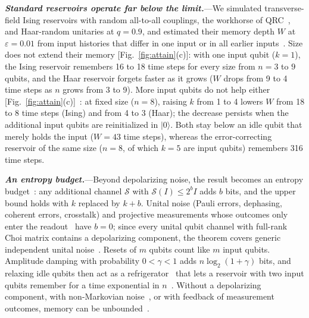 \documentclass[aps,prl,twocolumn,superscriptaddress,floatfix]{revtex4-2}
\theoremstyle{plain}
\newcommand{\ket}[1]{|#1\rangle}
\newcommand{\runin}[1]{\textit{\textbf{#1}}---}
\begin{document}
\runin{Standard reservoirs operate far below the limit.}We simulated transverse-field Ising reservoirs with random all-to-all couplings, the workhorse of QRC~\cite{Fujii2017,Nakajima2019,MartinezPena2021}, and Haar-random unitaries at $q=0.9$, and estimated their memory depth $W$ at $\varepsilon=0.01$ from input histories that differ in one input or in all earlier inputs~\cite{SM}. Size does not extend their memory [Fig.~\ref{fig:attain}(c)]: with one input qubit ($k=1$), the Ising reservoir remembers 16 to 18 time steps for every size from $n=3$ to $9$ qubits, and the Haar reservoir forgets faster as it grows ($W$ drops from 9 to 4 time steps as $n$ grows from 3 to 9). More input qubits do not help either [Fig.~\ref{fig:attain}(c)]~\cite{SM}: at fixed size ($n=8$), raising $k$ from 1 to 4 lowers $W$ from 18 to 8 time steps (Ising) and from 4 to 3 (Haar); the decrease persists when the additional input qubits are reinitialized in $\ket0$. Both stay below an idle qubit that merely holds the input ($W=43$ time steps), whereas the error-correcting reservoir of the same size ($n=8$, of which $k=5$ are input qubits) remembers 316 time steps.

\runin{An entropy budget.}Beyond depolarizing noise, the result becomes an entropy budget~\cite{SM}: any additional channel $\mathcal S$ with $\mathcal S(I)\le2^bI$ adds $b$ bits, and the upper bound holds with $k$ replaced by $k+b$. Unital noise (Pauli errors, dephasing, coherent errors, crosstalk) and projective measurements whose outcomes only enter the readout~\cite{Mujal2023} have $b=0$; since every unital qubit channel with full-rank Choi matrix contains a depolarizing component, the theorem covers generic independent unital noise~\cite{SM}. Resets of $m$ qubits count like $m$ input qubits. Amplitude damping with probability $0<\gamma<1$ adds $n\log_2(1+\gamma)$ bits, and relaxing idle qubits then act as a refrigerator~\cite{BenOr2013} that lets a reservoir with two input qubits remember for a time exponential in $n$~\cite{SM,Hoeffding1963}. Without a depolarizing component, with non-Markovian noise~\cite{Sannia2026}, or with feedback of measurement outcomes, memory can be unbounded~\cite{SM}.
\end{document}
